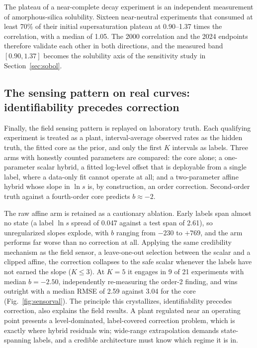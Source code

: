 \documentclass[review,number,sort&compress]{elsarticle}
\begin{document}
The plateau of a near-complete decay experiment is an independent
measurement of amorphous-silica solubility. Sixteen near-neutral
experiments that consumed at least 70\% of their initial
supersaturation plateau at 0.90--1.37 times the
\citet{gunnarsson2000amorphous} correlation, with a median of 1.05. The
2000 correlation and the 2024 endpoints therefore validate each other
in both directions, and the measured band $[0.90, 1.37]$ becomes the
solubility axis of the sensitivity study in Section~\ref{sec:sobol}.

\subsection{The sensing pattern on real curves: identifiability
precedes correction}\label{sec:sensorval}

Finally, the field sensing pattern is replayed on laboratory truth.
Each qualifying experiment is treated as a plant, interval-average
observed rates as the hidden truth, the fitted core as the prior, and
only the first $K$ intervals as labels. Three arms with honestly
counted parameters are compared: the core alone; a one-parameter scalar
hybrid, a fitted log-level offset that is deployable from a single
label, where a data-only fit cannot operate at all; and a two-parameter
affine hybrid whose slope in $\ln s$ is, by construction, an order
correction. Second-order truth against a fourth-order core predicts
$b \approx -2$.

The raw affine arm is retained as a cautionary ablation. Early labels
span almost no state (a label $\ln s$ spread of 0.047 against a test
span of 2.61), so unregularized slopes explode, with $b$ ranging from
$-230$ to $+769$, and the arm performs far worse than no correction at
all. Applying the same credibility mechanism as the field sensor, a
leave-one-out selection between the scalar and a clipped affine, the
correction collapses to the safe scalar whenever the labels have not
earned the slope ($K \le 3$). At $K = 5$ it engages in 9 of 21
experiments with median $b = -2.50$, independently re-measuring the
order-2 finding, and wins outright with a median RMSE of 2.59 against
3.04 for the core (Fig.~\ref{fig:sensorval}). The principle this
crystallizes, identifiability precedes correction, also explains the
field results. A plant regulated near an operating point presents a
level-dominated, label-covered correction problem, which is exactly
where hybrid residuals win; wide-range extrapolation demands
state-spanning labels, and a credible architecture must know which
regime it is in.
\end{document}
